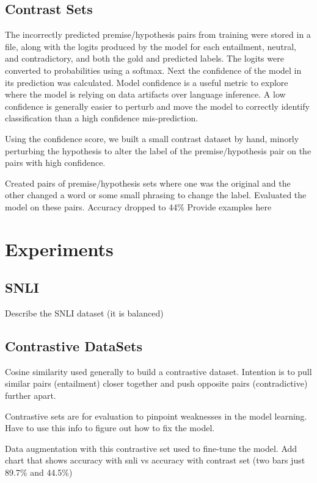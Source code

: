 \documentclass[11pt]{article}
\begin{document}
\subsection{Contrast Sets}
The incorrectly predicted premise/hypothesis pairs from training were stored in a file, along with the logits produced by the model for each entailment, neutral, and contradictory, and both the gold and predicted labels. The logits were converted to probabilities using a softmax. Next the confidence of the model in its prediction was calculated. Model confidence is a useful metric to explore where the model is relying on data artifacts over language inference. A low confidence is generally easier to perturb and move the model to correctly identify classification than a high confidence mis-prediction. 

Using the confidence score, we built a small contrast dataset by hand, minorly perturbing the hypothesis to alter the label of the premise/hypothesis pair on the pairs with high confidence.   

Created pairs of premise/hypothesis sets where one was the original and the other changed a word or some small phrasing to change the label. Evaluated the model on these pairs. Accuracy dropped to 44\%  Provide examples here

\section{Experiments}
\subsection{SNLI}

Describe the SNLI dataset (it is balanced) \citealp{dataAug}

\subsection{Contrastive DataSets}

Cosine similarity used generally to build a contrastive dataset. Intention is to pull similar pairs (entailment) closer together and push opposite pairs (contradictive) further apart.

Contrastive sets are for evaluation to pinpoint weaknesses in the model learning. Have to use this info to figure out how to fix the model.

Data augmentation with this contrastive set used to fine-tune the model.
Add chart that shows accuracy with snli vs accuracy with contrast set (two bars just 89.7\% and 44.5\%)
\end{document}
